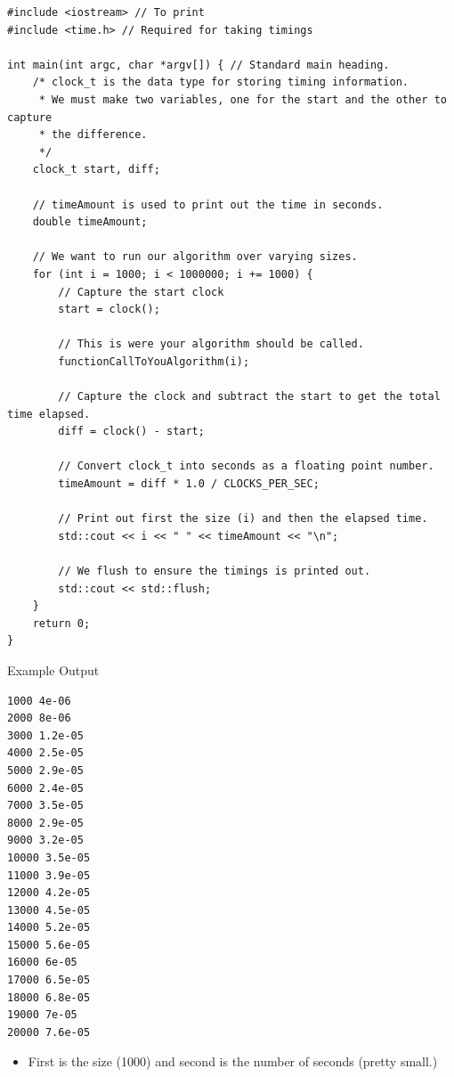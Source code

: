 \documentclass{beamer}
\begin{document}
\begin{frame}[fragile]{}
\begin{lstlisting}
#include <iostream> // To print
#include <time.h> // Required for taking timings

int main(int argc, char *argv[]) { // Standard main heading.
    /* clock_t is the data type for storing timing information.
     * We must make two variables, one for the start and the other to capture
     * the difference.
     */
    clock_t start, diff;

    // timeAmount is used to print out the time in seconds.
    double timeAmount;

    // We want to run our algorithm over varying sizes.
    for (int i = 1000; i < 1000000; i += 1000) {
        // Capture the start clock
        start = clock();

        // This is were your algorithm should be called.
        functionCallToYouAlgorithm(i);

        // Capture the clock and subtract the start to get the total time elapsed.
        diff = clock() - start;

        // Convert clock_t into seconds as a floating point number.
        timeAmount = diff * 1.0 / CLOCKS_PER_SEC;

        // Print out first the size (i) and then the elapsed time.
        std::cout << i << " " << timeAmount << "\n";

        // We flush to ensure the timings is printed out.
        std::cout << std::flush;
    }
    return 0;
}

\end{lstlisting}
\end{frame}

\begin{frame}[fragile]{Example Output}
\begin{lstlisting}
1000 4e-06
2000 8e-06
3000 1.2e-05
4000 2.5e-05
5000 2.9e-05
6000 2.4e-05
7000 3.5e-05
8000 2.9e-05
9000 3.2e-05
10000 3.5e-05
11000 3.9e-05
12000 4.2e-05
13000 4.5e-05
14000 5.2e-05
15000 5.6e-05
16000 6e-05
17000 6.5e-05
18000 6.8e-05
19000 7e-05
20000 7.6e-05
\end{lstlisting}
\begin{itemize}
\item First is the size (1000) and second is the number of seconds (pretty small.)
\end{itemize}
\end{frame}
\end{document}
